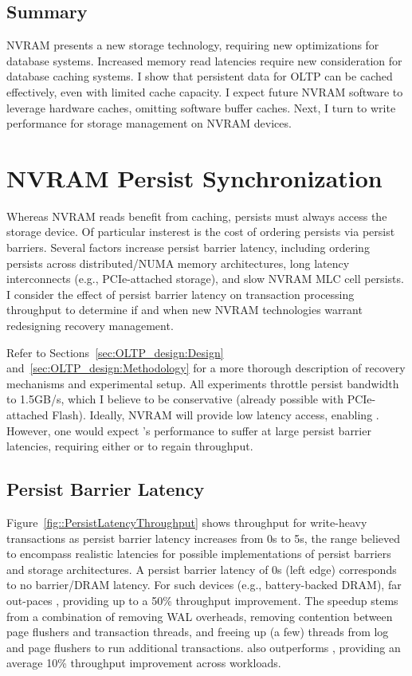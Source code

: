 \subsection{Summary}
\label{sec:OLTP_eval:Reads:Summary}
NVRAM presents a new storage technology, requiring new optimizations for database systems.
Increased memory read latencies require new consideration for database caching systems.
I show that persistent data for OLTP can be cached effectively, even with limited cache capacity.
I expect future NVRAM software to leverage hardware caches, omitting software buffer caches.
Next, I turn to write performance for storage management on NVRAM devices.

\section{NVRAM Persist Synchronization}
\label{sec:OLTP_eval:Persists}

Whereas NVRAM reads benefit from caching, persists must always access the storage device.
Of particular insterest is the cost of ordering persists via persist barriers.
Several factors increase persist barrier latency, including ordering persists across distributed/NUMA memory architectures, long latency interconnects (e.g., PCIe-attached storage), and slow NVRAM MLC cell persists.
I consider the effect of persist barrier latency on transaction processing throughput to determine if and when new NVRAM technologies warrant redesigning recovery management.

Refer to Sections~\ref{sec:OLTP_design:Design} and~\ref{sec:OLTP_design:Methodology} for a more thorough description of recovery mechanisms and experimental setup.
All experiments throttle persist bandwidth to 1.5GB/s, which I believe to be conservative (already possible with PCIe-attached Flash).
Ideally, NVRAM will provide low latency access, enabling \InPlace.
However, one would expect \InPlace's performance to suffer at large persist barrier latencies, requiring either \NVDisk or \GroupCommit to regain throughput.

\subsection{Persist Barrier Latency}
\label{sec:OLTP_eval:Persists:Performance}



Figure~\ref{fig::PersistLatencyThroughput} shows throughput for write-heavy transactions as persist barrier latency increases from 0\textmu s to 5\textmu s, the range believed to encompass realistic latencies for possible implementations of persist barriers and storage architectures.
A persist barrier latency of 0\textmu s (left edge) corresponds to no barrier/DRAM latency.
For such devices (e.g., battery-backed DRAM), \InPlace far out-paces \NVDisk, providing up to a 50\% throughput improvement.
The speedup stems from a combination of removing WAL overheads, removing contention between page flushers and transaction threads, and freeing up (a few) threads from log and page flushers to run additional transactions.
\InPlace also outperforms \GroupCommit, providing an average 10\% throughput improvement across workloads.

